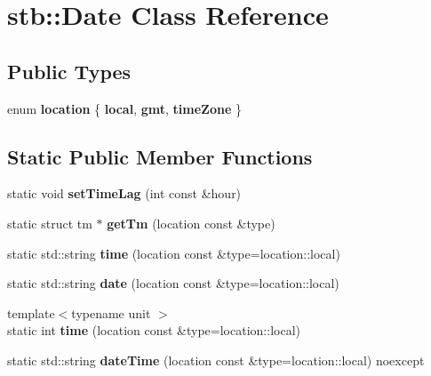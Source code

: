 \hypertarget{classstb_1_1Date}{\section{stb\+:\+:Date Class Reference}
\label{classstb_1_1Date}
}
\subsection*{Public Types}
\begin{DoxyCompactItemize}
\item 
\hypertarget{classstb_1_1Date_a56dfb05108f2cffb67a27472bb016c40}{enum {\bfseries location} \{ {\bfseries local}, 
{\bfseries gmt}, 
{\bfseries time\+Zone}
 \}}\label{classstb_1_1Date_a56dfb05108f2cffb67a27472bb016c40}

\end{DoxyCompactItemize}
\subsection*{Static Public Member Functions}
\begin{DoxyCompactItemize}
\item 
\hypertarget{classstb_1_1Date_a4fa263d1ae1e64f04b1720f6125de802}{static void {\bfseries set\+Time\+Lag} (int const \&hour)}\label{classstb_1_1Date_a4fa263d1ae1e64f04b1720f6125de802}

\item 
\hypertarget{classstb_1_1Date_ab12a4358f2d26b4e005b1fbf15f3cf90}{static struct tm $\ast$ {\bfseries get\+Tm} (location const \&type)}\label{classstb_1_1Date_ab12a4358f2d26b4e005b1fbf15f3cf90}

\item 
\hypertarget{classstb_1_1Date_a289896845e749fc4ba165a2c9e1a4d0c}{static std\+::string {\bfseries time} (location const \&type=location\+::local)}\label{classstb_1_1Date_a289896845e749fc4ba165a2c9e1a4d0c}

\item 
\hypertarget{classstb_1_1Date_a6cbe1411bd4d2f8a48b308a162c0f1c2}{static std\+::string {\bfseries date} (location const \&type=location\+::local)}\label{classstb_1_1Date_a6cbe1411bd4d2f8a48b308a162c0f1c2}

\item 
\hypertarget{classstb_1_1Date_a22dc18f2610f21ff1a061268abadaf2d}{{\footnotesize template$<$typename unit $>$ }\\static int {\bfseries time} (location const \&type=location\+::local)}\label{classstb_1_1Date_a22dc18f2610f21ff1a061268abadaf2d}

\item 
\hypertarget{classstb_1_1Date_afd48ca74cbbd0b476c2e168c23cb7d60}{static std\+::string {\bfseries date\+Time} (location const \&type=location\+::local) noexcept}\label{classstb_1_1Date_afd48ca74cbbd0b476c2e168c23cb7d60}

\end{DoxyCompactItemize}
